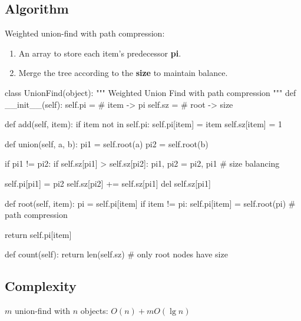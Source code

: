 \subsection{Algorithm}
Weighted union-find with path compression: 
\begin{enumerate}
\item An array to store each item's predecessor \textbf{pi}. 
\item Merge the tree according to the \textbf{size} to maintain balance. 
\end{enumerate}
\begin{python}
class UnionFind(object):
    """
    Weighted Union Find with path compression
    """
    def __init__(self):
        self.pi = {}  # item -> pi
        self.sz = {}  # root -> size

    def add(self, item):
        if item not in self.pi:
            self.pi[item] = item
            self.sz[item] = 1

    def union(self, a, b):
        pi1 = self.root(a)
        pi2 = self.root(b)

        if pi1 != pi2:
            if self.sz[pi1] > self.sz[pi2]:
                pi1, pi2 = pi2, pi1
                # size balancing

            self.pi[pi1] = pi2
            self.sz[pi2] += self.sz[pi1]
            del self.sz[pi1]

    def root(self, item):
        pi = self.pi[item]
        if item != pi:
            self.pi[item] = self.root(pi)
            # path compression 

        return self.pi[item]
        
    def count(self):
        return len(self.sz)  # only root nodes have size
\end{python}

\subsection{Complexity}
$m$ union-find with $n$ objects: $O(n)+m O(\lg n)$

